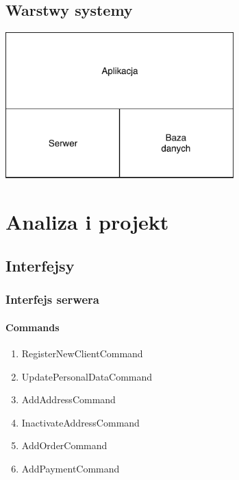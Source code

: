 \documentclass[10pt]{report}
\begin{document}
		\section{Warstwy systemy}
			\begin{center}
				\includegraphics[width=250pt]{layers.pdf}
			\end{center}
		

	\renewcommand{\thesection}{\thechapter.\arabic{section}}	
	

	
\chapter{Analiza i projekt}


\section{Interfejsy}


\subsection{Interfejs serwera}

\subsubsection{Commands}

\begin{enumerate}
	\item RegisterNewClientCommand
	\item UpdatePersonalDataCommand
	\item AddAddressCommand
	\item InactivateAddressCommand
	\item AddOrderCommand
	\item AddPaymentCommand
	
\end{enumerate} 
\end{document}
